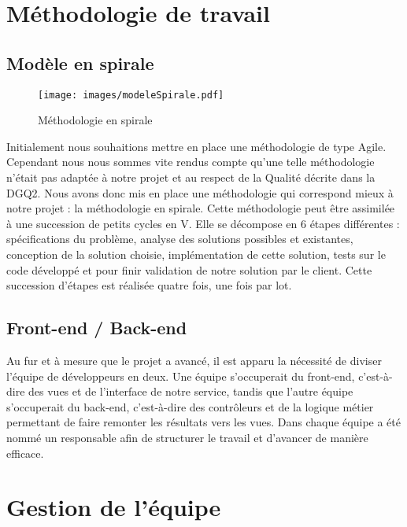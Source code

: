 \documentclass[asi]{picInsa}
\begin{document}
\section{Méthodologie de travail}
\subsection{Modèle en spirale}
\begin{figure}[!h]
	\begin{center}
	\texttt{[image: images/modeleSpirale.pdf]}
	\label{diagrammeSpirale}
	\caption{Méthodologie en spirale}
	\end{center}
\end{figure}

Initialement nous souhaitions mettre en place une méthodologie de type Agile. Cependant nous nous sommes vite rendus compte qu'une telle méthodologie n'était pas adaptée à notre projet et au respect de la Qualité décrite dans la DGQ2. Nous avons donc mis en place une méthodologie qui correspond mieux à notre projet : la méthodologie en spirale. Cette méthodologie peut être assimilée à une succession de petits cycles en V. Elle se décompose en 6 étapes différentes : spécifications du problème, analyse des solutions possibles et existantes, conception de la solution choisie, implémentation de cette solution, tests sur le code développé et pour finir validation de notre solution par le client. Cette succession d'étapes est réalisée quatre fois, une fois par lot.

\subsection{Front-end / Back-end}
Au fur et à mesure que le projet a avancé, il est apparu la nécessité de diviser l'équipe de développeurs en deux. Une équipe s'occuperait du front-end, c'est-à-dire des vues et de l'interface de notre service, tandis que l'autre équipe s'occuperait du back-end, c'est-à-dire des contrôleurs et de la logique métier permettant de faire remonter les résultats vers les vues. Dans chaque équipe a été nommé un responsable afin de structurer le travail et d'avancer de manière efficace.



\section{Gestion de l'équipe}
\end{document}
